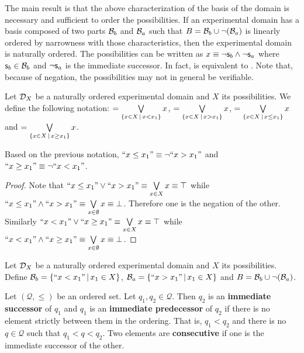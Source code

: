 \documentclass[11pt,letterpaper,fleqn]{memoir} %
\begin{document}
The main result is that the above characterization of the basis of the domain is necessary and sufficient to order the possibilities. If an experimental domain has a basis composed of two parts $\mathcal{B}_b$ and $\mathcal{B}_a$ such that $B=\mathcal{B}_b \cup \neg(\mathcal{B}_a)$ is linearly ordered by narrowness with those characteristics, then the experimental domain is naturally ordered. The possibilities can be written as $x \equiv \neg \mathsf{s}_b \wedge \neg \mathsf{s}_a$ where $\mathsf{s}_b \in \mathcal{B}_b$ and $\neg \mathsf{s}_a$ is the immediate successor. In fact,  is equivalent to . Note that, because of negation, the possibilities may not in general be verifiable.

\begin{mathSection}
\begin{defn}
	Let $\mathcal{D}_X$ be a naturally ordered experimental domain and $X$ its possibilities. We define the following notation:
	$=\bigvee\limits_{\{x \in X \, | \, x < x_1\}} x$, $=\bigvee\limits_{\{x \in X \, | \, x > x_1\}} x$, $=\bigvee\limits_{\{x \in X \, | \, x \leq x_1\}} x$ and $=\bigvee\limits_{\{x \in X \, | \, x \geq x_1\}} x$.
\end{defn}
\begin{coro}\label{3_coro_not_after_is_before_or_on}
	Based on the previous notation, $``x \leq x_1"\equiv \neg ``x > x_1"$ and $``x \geq x_1"\equiv \neg ``x < x_1"$.
\end{coro}
\begin{proof}
	Note that $``x \leq x_1" \vee ``x > x_1" \equiv \bigvee\limits_{x \in X} x \equiv \top$ while $``x \leq x_1" \wedge ``x > x_1" \equiv \bigvee\limits_{x \in \emptyset} x \equiv \bot$. Therefore one is the negation of the other. Similarly $``x < x_1" \vee ``x \geq x_1" \equiv \bigvee\limits_{x \in X} x \equiv \top$ while $``x < x_1" \wedge ``x \geq x_1" \equiv \bigvee\limits_{x \in \emptyset} x \equiv \bot$.
\end{proof}
\begin{defn}\label{3_def_before_after_basis}
	Let $\mathcal{D}_X$ be a naturally ordered experimental domain and $X$ its possibilities. Define $\mathcal{B}_b = \{ ``x < x_1" \, | \, x_1 \in X \}$, $\mathcal{B}_a = \{ ``x > x_1" \, | \, x_1 \in X \}$ and $B = \mathcal{B}_b \cup \neg (\mathcal{B}_a)$.
\end{defn}
\begin{defn}
	Let $(\mathcal{Q}, \leq)$ be an ordered set. Let $q_1, q_2 \in \mathcal{Q}$. Then $q_2$ is an \textbf{immediate successor} of $q_1$ and $q_1$ is an \textbf{immediate predecessor} of $q_2$ if there is no element strictly between them in the ordering. That is, $q_1 < q_2$ and there is no $q \in \mathcal{Q}$ such that $q_1 < q < q_2$. Two elements are \textbf{consecutive} if one is the immediate successor of the other.
\end{defn}


\end{mathSection}
\end{document}
